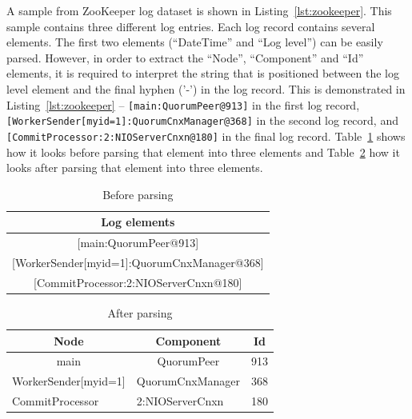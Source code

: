 A sample from ZooKeeper log dataset is shown in Listing~\ref{lst:zookeeper}. This sample contains three different log entries. Each log record contains several elements. The first two elements (``DateTime'' and ``Log level'') can be easily parsed. However, in order to extract the ``Node'', ``Component'' and ``Id'' elements, it is required to interpret the string that is positioned between the log level element and the final hyphen ('-') in the log record. This is demonstrated in Listing~\ref{lst:zookeeper} \--- \texttt{[main:QuorumPeer@913]} in the first log record, \texttt{[WorkerSender[myid=1]:QuorumCnxManager@368]} in the second log record, and \texttt{[CommitProcessor:2:NIOServerCnxn@180]} in the final log record. Table~\ref{tab:before-parse} shows how it looks before parsing that element into three elements and Table~\ref{tab:after-parse} how it looks after parsing that element into three elements.

\begin{table}[H]
\centering
\caption{Before parsing}
\label{tab:before-parse}
\vspace*{2mm}
\begin{tabular}{|cll|}
\hline
\multicolumn{3}{|c|}{\textbf{Log elements}} \\ \hline
\multicolumn{3}{|c|}{{[}main:QuorumPeer@913{]}} \\ \hline
\multicolumn{3}{|c|}{{[}WorkerSender{[}myid=1{]}:QuorumCnxManager@368{]}} \\ \hline
\multicolumn{3}{|c|}{{[}CommitProcessor:2:NIOServerCnxn@180{]}} \\ \hline
\end{tabular}
\end{table}

\begin{table}[H]
\centering
\caption{After parsing}
\label{tab:after-parse}
\vspace*{2mm}
\begin{tabular}{|c|c|c|}
\hline
\textbf{Node} & \textbf{Component} & \textbf{Id} \\ \hline
main & QuorumPeer & 913 \\ \hline
WorkerSender{[}myid=1{]} & QuorumCnxManager & 368 \\ \hline
\multicolumn{1}{|l|}{CommitProcessor} & \multicolumn{1}{l|}{2:NIOServerCnxn} & \multicolumn{1}{l|}{180} \\ \hline
\end{tabular}
\vspace*{5mm}
\end{table}

